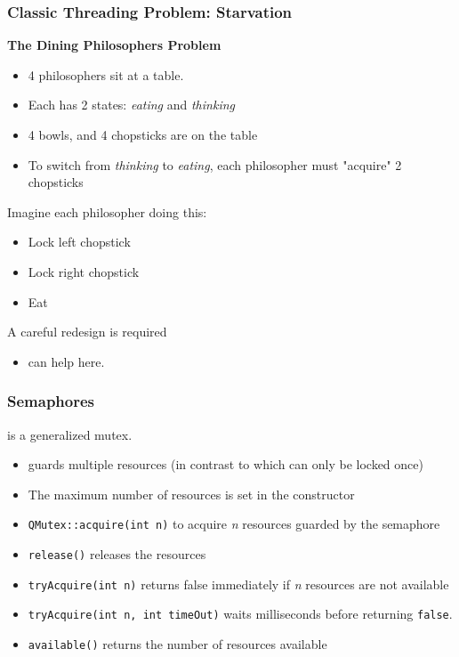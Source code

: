 \begin{slide}
\frametitle{Classic Threading Problem: Starvation}

\textbf{The Dining Philosophers Problem}
\begin{itemize}
\item 4 philosophers sit at a table.
\item Each has 2 states: \textit{eating} and \textit{thinking}
\item 4 bowls, and 4 chopsticks are on the table
\item To switch from \textit{thinking} to \textit{eating},
      each philosopher must "acquire" 2 chopsticks
\end{itemize}
Imagine each philosopher doing this:
\begin{itemize}
\item  Lock left chopstick
\item  Lock right chopstick
\item  Eat
\end{itemize}

A careful redesign is required
\begin{itemize}
\item {} can help here.
\end{itemize}
\end{slide}

\begin{slide}
\frametitle{Semaphores}

 is a generalized mutex.
\begin{itemize}
\item {} guards multiple resources (in contrast to 
      which can only be locked once)
\item The maximum number of resources is set in the constructor
\item \texttt{QMutex::acquire(int n)} to acquire \textit{n} resources guarded
      by the semaphore
\item \texttt{release()} releases the resources
\item \texttt{tryAcquire(int n)} returns false immediately if \textit{n} resources
      are not available
\item \texttt{tryAcquire(int n, int timeOut)} waits milliseconds before
      returning \texttt{false}.
\item \texttt{available()} returns the number of resources available
\end{itemize}
\end{slide}

